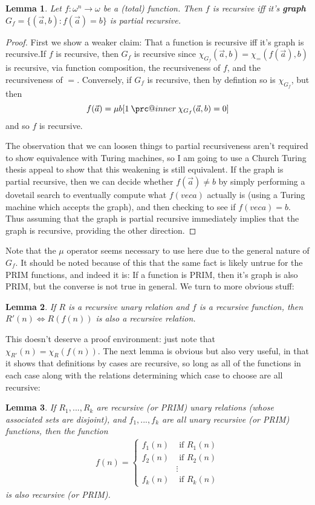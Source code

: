 \documentclass{article}
\makeatletter
\newcommand{\prc}{\mathbin{\mathpalette\prc@inner\relax}}
\newcommand{\prc@inner}[2]{%
  \vbox{\offinterlineskip\m@th
    \ialign{%
      ##\cr
      \hidewidth\raisebox{-1.5\height}[0pt][0pt]{$#1.$}\hidewidth\cr
      $#1-$\cr
    }%
  }%
}
\theoremstyle{definition}
\theoremstyle{plain}
\theoremstyle{theorem}
\newtheorem{lemma}{Lemma}[section]
\makeatother
\begin{document}
\begin{lemma}
    Let $f: \omega^n \to \omega$ be a (total) function. Then $f$ is recursive iff it's \textbf{graph} $G_f = \{(\vec{a},b): f(\vec{a}) = b\}$ is partial recursive.
\end{lemma}
\begin{proof}
    First we show a weaker claim: That a function is recursive iff it's graph is recursive.If $f$ is recursive, then $G_f$ is recursive since $\chi_{G_f}(\vec{a},b) = \chi_=(f(\vec{a}),b)$ is recursive, via function composition, the recursiveness of $f$, and the recursiveness of $=$. Conversely, if $G_f$ is recursive, then by defintion so is $\chi_{G_f}$, but then 
    \[ f(\vec{a}) = \mu b[1 \prc \chi_{G_f}(\vec{a},b) = 0] \]
    and so $f$ is recursive.
    \par The observation that we can loosen things to partial recursiveness aren't required to show equivalence with Turing machines, so I am going to use a Church Turing thesis appeal to show that this weakening is still equivalent. If the graph is partial recursive, then we can decide whether $f(\vec{a}) \neq b$ by simply performing a dovetail search to eventually compute what $f(vec{a})$ actually is (using a Turing machine which accepts the graph), and then checking to see if $f(vec{a}) = b$. Thus assuming that the graph is partial recursive immediately implies that the graph is recursive, providing the other direction.
\end{proof}
Note that the $\mu$ operator seems necessary to use here due to the general nature of $G_f$. It should be noted because of this that the same fact is likely untrue for the PRIM functions, and indeed it is: If a function is PRIM, then it's graph is also PRIM, but the converse is not true in general. We turn to more obvious stuff:
\begin{lemma}
    If $R$ is a recursive unary relation and $f$ is a recursive function, then $R'(n) \iff R(f(n))$ is also a recursive relation.
\end{lemma}
This doesn't deserve a proof environment: just note that $\chi_{R'}(n) = \chi_R(f(n))$. The next lemma is obvious but also very useful, in that it shows that definitions by cases are recursive, so long as all of the functions in each case along with the relations determining which case to choose are all recursive:
\begin{lemma}
    If $R_1,...,R_k$ are recursive (or PRIM) unary relations (whose associated sets are disjoint), and $f_1,...,f_k$ are all unary recursive (or PRIM) functions, then the function
    \begin{align}
        f(n) = \begin{cases}
                  f_1(n) & \textrm{ if $R_1(n)$}  \\
                  f_2(n) & \textrm{ if $R_2(n)$} \\
                  & \vdots \\
                  f_k(n) & \textrm{ if $R_k(n)$} 
               \end{cases}
    \end{align}
    is also recursive (or PRIM).
\end{lemma}
\end{document}
